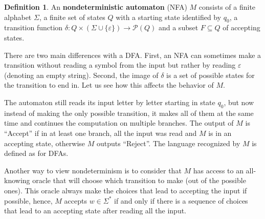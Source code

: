 \documentclass{article}
\theoremstyle{definition}
\newtheorem{defn}[thm]{Definition}
\theoremstyle{remark}
\newcommand{\mP}{\mathcal{P}}
\begin{document}
\begin{defn}
	An \textbf{nondeterministic automaton} (NFA) $M$ consists of a finite alphabet $\Sigma$, a finite set of states $Q$ with a starting state identified by $q_0$, a transition function $\delta : Q \times (\Sigma \cup \{\varepsilon\}) \rightarrow \mP(Q)$ and a subset $F \subseteq Q$ of accepting states.
	
	There are two main differences with a DFA. First, an NFA can sometimes make a transition without reading a symbol from the input but rather by reading $\varepsilon$ (denoting an empty string). Second, the image of $\delta$ is a set of possible states for the transition to end in. Let us see how this affects the behavior of $M$.
	
	The automaton still reads its input letter by letter starting in state $q_0$, but now instead of making the only possible transition, it makes all of them at the same time and continues the computation on multiple branches. The output of $M$ is ``Accept'' if in at least one branch, all the input was read and $M$ is in an accepting state, otherwise $M$ outputs ``Reject''. The language recognized by $M$ is defined as for DFAs.
	
	Another way to view nondeterminism is to consider that $M$ has access to an all-knowing oracle that will choose which transition to make (out of the possible ones). This oracle always make the choices that lead to accepting the input if possible, hence, $M$ accepts $w \in \Sigma^*$ if and only if there is a sequence of choices that lead to an accepting state after reading all the input.
\end{defn}
\end{document}
